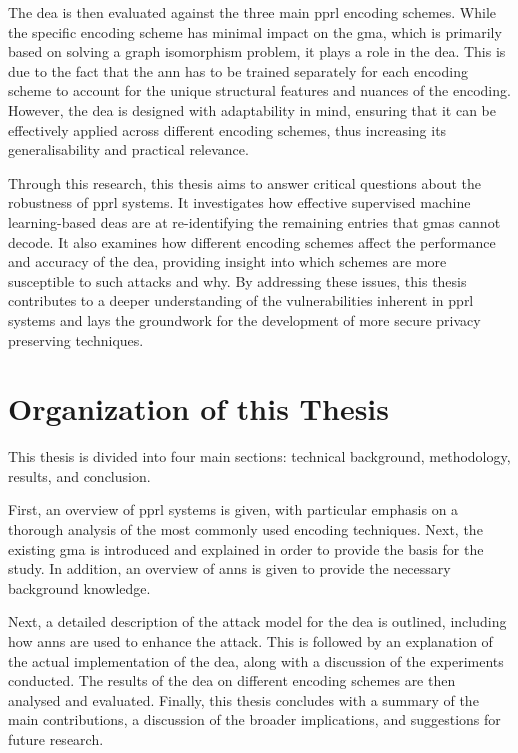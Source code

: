 The \ac{dea} is then evaluated against the three main \ac{pprl} encoding schemes.
While the specific encoding scheme has minimal impact on the \ac{gma}, which is primarily based on solving a graph isomorphism problem, it plays a role in the \ac{dea}.
This is due to the fact that the \ac{ann} has to be trained separately for each encoding scheme to account for the unique structural features and nuances of the encoding.
However, the \ac{dea} is designed with adaptability in mind, ensuring that it can be effectively applied across different encoding schemes, thus increasing its generalisability and practical relevance.

Through this research, this thesis aims to answer critical questions about the robustness of \ac{pprl} systems.
It investigates how effective supervised machine learning-based \ac{dea}s are at re-identifying the remaining entries that \ac{gma}s cannot decode.
It also examines how different encoding schemes affect the performance and accuracy of the \ac{dea}, providing insight into which schemes are more susceptible to such attacks and why.
By addressing these issues, this thesis contributes to a deeper understanding of the vulnerabilities inherent in \ac{pprl} systems and lays the groundwork for the development of more secure privacy preserving techniques.

\section{Organization of this Thesis}  \label{sec:orga}

This thesis is divided into four main sections: technical background, methodology, results, and conclusion.

First, an overview of \ac{pprl} systems is given, with particular emphasis on a thorough analysis of the most commonly used encoding techniques.
Next, the existing \ac{gma} is introduced and explained in order to provide the basis for the study.
In addition, an overview of \ac{ann}s is given to provide the necessary background knowledge.

Next, a detailed description of the attack model for the \ac{dea} is outlined, including how \ac{ann}s are used to enhance the attack.
This is followed by an explanation of the actual implementation of the \ac{dea}, along with a discussion of the experiments conducted.
The results of the \ac{dea} on different encoding schemes are then analysed and evaluated.
Finally, this thesis concludes with a summary of the main contributions, a discussion of the broader implications, and suggestions for future research.